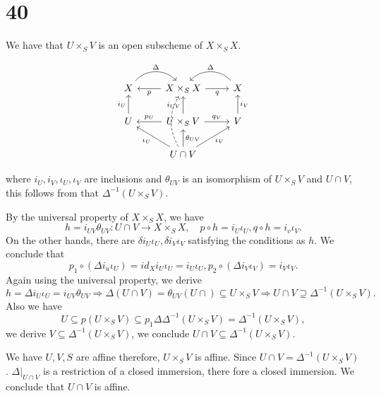\documentclass{article}
\numberwithin{equation}{section}
\begin{document}
\section*{40}

We have that $U\times_SV$ is an open subscheme of $X\times_SX$. 

\[
\begin{tikzcd}
X \arrow[r, "\Delta", bend left=49] & X\times_SX \arrow[l, "p"] \arrow[r, "q"']                                                                    & X \arrow[l, "\Delta"', bend right=49] \\
U \arrow[u, "i_U"]                  & U\times_S V \arrow[l, "p_U"'] \arrow[r, "q_V"] \arrow[u, "i_{UV}"]                                           & V \arrow[u, "i_V"']                   \\
                                    & U\cap V \arrow[lu, "\iota_U"] \arrow[ru, "\iota_V"'] \arrow[u, "\theta_{UV}"'] \arrow[uu, dashed, bend left] &                                      
\end{tikzcd}
\]

where $i_U,i_V,\iota_U,\iota_V$ are inclusions and $\theta_{UV}$ is an isomorphism of $U\times_SV$ and $U\cap V$, this follows from that $\Delta^{-1}(U\times_SV)$.\\
\par By the universal property of $X\times_S X$, we have
\begin{equation*}
h = i_{UV}\theta_{UV}:U\cap V\to X\times_S X, \quad p\circ h  = i_U\iota_U, q\circ h = i_v\iota_V.
\end{equation*}
On the other hands, there are $\delta i_U\iota_U, \delta i_V\iota_V$ satisfying the conditions as $h$. We conclude that 
\begin{equation*}
p_1\circ(\Delta i_u\iota_U)=id_Xi_U\iota_U = i_U\iota_U, p_2\circ(\Delta i_V\iota_V) = i_V\iota_V.
\end{equation*}
Again using the universal property, we derive
\begin{equation*}
h = \Delta i_U\iota_U = i_{UV}\theta_{UV}\Rightarrow \Delta(U\cap V) = \theta_{UV}(U\cap)\subseteq U\times_S V\Rightarrow U\cap V\supseteq\Delta^{-1}(U\times_SV).
\end{equation*}
Also we have
\begin{equation*}
U\subseteq p(U\times_S V)\subseteq p_1\Delta\Delta^{-1}(U\times_S V) = \Delta^{-1}(U\times_S V),
\end{equation*}
we derive $V\subseteq\Delta^{-1}(U\times_SV)$, we conclude $U\cap V\subseteq \Delta^{-1}(U\times_SV)$.\\
\par We have $U,V,S$ are affine therefore, $U\times_S V$ is affine. Since $U\cap V=\Delta^{-1}(U\times_S V)$. $\Delta|_{U\cap V}$ is a restriction of a closed immersion, there fore a closed immersion. We conclude that $U\cap V$ is affine.
\end{document}
